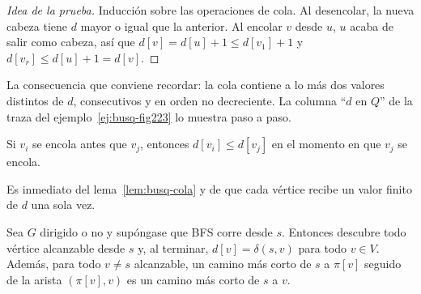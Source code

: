 \documentclass[11pt,letterpaper]{article}
\begin{document}
\begin{proof}[Idea de la prueba]
  Inducción sobre las operaciones de cola. Al desencolar, la nueva
  cabeza tiene $d$ mayor o igual que la anterior. Al encolar $v$ desde
  $u$, $u$ acaba de salir como cabeza, así que
  $d[v] = d[u] + 1 \leq d[v_1] + 1$ y $d[v_r] \leq d[u] + 1 = d[v]$.
\end{proof}

La consecuencia que conviene recordar: la cola contiene a lo más dos
valores distintos de $d$, consecutivos y en orden no decreciente. La
columna ``$d$ en $Q$'' de la traza del
ejemplo~\ref{ej:busq-fig223} lo muestra paso a paso.

\begin{corolario}
  \label{cor:busq-orden-cola}
  Si $v_i$ se encola antes que $v_j$, entonces $d[v_i] \leq d[v_j]$
  en el momento en que $v_j$ se encola.
\end{corolario}

Es inmediato del lema~\ref{lem:busq-cola} y de que cada vértice recibe
un valor finito de $d$ una sola vez.

\begin{teorema}
  \label{teo:busq-correccion-bfs}
  Sea $G$ dirigido o no y supóngase que BFS corre desde $s$. Entonces
  descubre todo vértice alcanzable desde $s$ y, al terminar,
  $d[v] = \delta(s, v)$ para todo $v \in V$. Además, para todo
  $v \neq s$ alcanzable, un camino más corto de $s$ a $\pi[v]$
  seguido de la arista $(\pi[v], v)$ es un camino más corto de $s$ a
  $v$.
\end{teorema}
\end{document}
